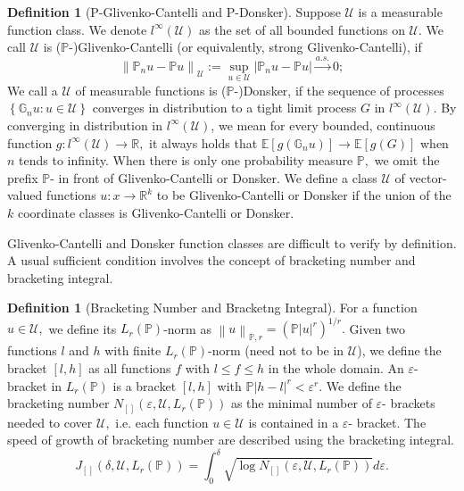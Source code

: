 \documentclass{article}
\numberwithin{equation}{section}
\theoremstyle{plain}
\theoremstyle{definition}
\newtheorem{definition}[theorem]{Definition}
\theoremstyle{remark}
\begin{document}
\begin{definition}[P-Glivenko-Cantelli and P-Donsker\citep{van}]
    Suppose $\mathcal{U}$ is a measurable function class. We denote $l^{\infty}(\mathcal{U})$ as the set of all bounded functions on $\mathcal{U}.$ We call $\mathcal{U}$ is ($\mathbb{P}$-)Glivenko-Cantelli (or equivalently, strong Glivenko-Cantelli), if 
\begin{equation}\label{definition_GC}
    \left\|\mathbb{P}_n u - \mathbb{P} u\right\|_{\mathcal{U}} := \sup_{u \in \mathcal{U}} \left|\mathbb{P}_n u - \mathbb{P} u\right| \stackrel{a.s.}{\longrightarrow} 0;
\end{equation}
 We call a $\mathcal{U}$ of measurable functions is ($\mathbb{P}$-)Donsker, if the sequence of processes $\left\{\mathbb{G}_n u: u \in \mathcal{U}\right\}$ converges in distribution to a tight limit process $G$ in $l^{\infty}(\mathcal{U}).$ By converging in distribution in $l^{\infty}\left(\mathcal{U}\right)$, we mean for every bounded, continuous function $g: l^{\infty}(\mathcal{U}) \to \mathbb{R},$ it always holds that $\mathbb{E} [g(\mathbb{G}_n u)] \to \mathbb{E}[g(G)]$ when $n$ tends to infinity. When there is only one probability measure $\mathbb{P},$ we omit the prefix $\mathbb{P}$- in front of Glivenko-Cantelli or Donsker. We define a class $\mathcal{U}$ of vector-valued functions $u: x \to \mathbb{R}^k$ to be Glivenko-Cantelli or Donsker if the union of the $k$ coordinate classes is Glivenko-Cantelli or Donsker.
\end{definition}

Glivenko-Cantelli and Donsker function classes are difficult to verify by definition. A usual sufficient condition involves the concept of bracketing number and bracketing integral.

\begin{definition}[Bracketing Number and Bracketng Integral]
    For a function $u \in \mathcal{U},$ we define its $L_r(\mathbb{P})$-norm as $\left\| u \right\|_{\mathbb{P},r} = (\mathbb{P} \left|u \right|^r)^{1/r}.$ Given two functions $l$ and $h$ with finite $L_r(\mathbb{P})$-norm (need not to be in $\mathcal{U}$), we define the bracket $[l,h]$ as all functions $f$ with $l \leq f \leq h$ in the whole domain. 
    An $\varepsilon$-bracket in $L_r(\mathbb{P})$ is a bracket $[l,h]$ with $\mathbb{P}|h-l|^r < \varepsilon^r.$ We define the bracketing number $N_{[]}(\varepsilon,\mathcal{U},L_r(\mathbb{P}))$ as the minimal number of $\varepsilon$- brackets needed to cover $\mathcal{U},$ i.e. each function $u \in \mathcal{U}$ is contained in a $\varepsilon$- bracket. The speed of growth of bracketing number are described using the bracketing integral.
    \begin{equation} \label{definition_bracketing_integral}
        J_{[]}\left(\delta,\mathcal{U},L_r(\mathbb{P})\right)  = \int_0^{\delta} \sqrt{\log N_{[]}\left(\varepsilon,\mathcal{U},L_r(\mathbb{P})\right)} d \varepsilon.
    \end{equation}
\end{definition}
\end{document}
